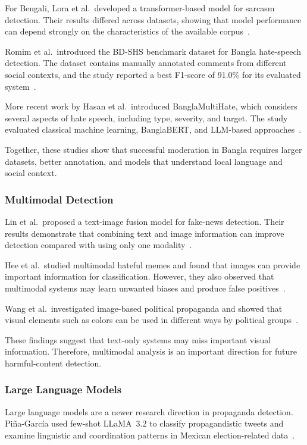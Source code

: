 For Bengali, Lora et al.\ developed a transformer-based model for sarcasm
detection. Their results differed across datasets, showing that model performance
can depend strongly on the characteristics of the available corpus~\cite{lora2023}.

Romim et al.\ introduced the BD-SHS benchmark dataset for Bangla hate-speech
detection. The dataset contains manually annotated comments from different social
contexts, and the study reported a best F1-score of 91.0\% for its evaluated
system~\cite{romim2022}.

More recent work by Hasan et al.\ introduced BanglaMultiHate, which considers
several aspects of hate speech, including type, severity, and target. The study
evaluated classical machine learning, BanglaBERT, and LLM-based
approaches~\cite{hasan2026}.

Together, these studies show that successful moderation in Bangla requires larger
datasets, better annotation, and models that understand local language and social
context.

\subsubsection*{Multimodal Detection}
Lin et al.\ proposed a text-image fusion model for fake-news detection. Their
results demonstrate that combining text and image information can improve detection
compared with using only one modality~\cite{lin2024}.

Hee et al.\ studied multimodal hateful memes and found that images can provide
important information for classification. However, they also observed that
multimodal systems may learn unwanted biases and produce false
positives~\cite{hee2022}.

Wang et al.\ investigated image-based political propaganda and showed that visual
elements such as colors can be used in different ways by political
groups~\cite{wang2022}.

These findings suggest that text-only systems may miss important visual
information. Therefore, multimodal analysis is an important direction for future
harmful-content detection.

\subsubsection*{Large Language Models}
Large language models are a newer research direction in propaganda detection.
Pi\~na-Garc\'ia used few-shot LLaMA~3.2 to classify propagandistic tweets and
examine linguistic and coordination patterns in Mexican election-related
data~\cite{pina2025}.

